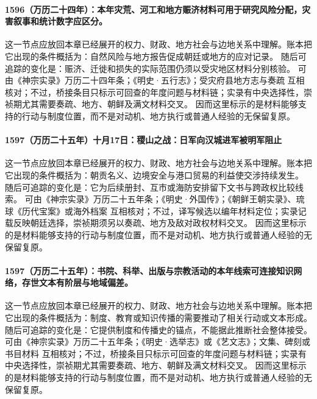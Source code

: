 \paragraph{1596（万历二十四年）：本年灾荒、河工和地方赈济材料可用于研究风险分配，灾害叙事和统计数字应区分。} 这一节点应放回本章已经展开的权力、财政、地方社会与边地关系中理解。账本把它出现的条件概括为：自然风险与地方报告促成朝廷或地方的应对记录。 随后可追踪的变化是：赈济、迁徙和损失的实际范围仍须以受灾地区材料分别核验。 可由《神宗实录》万历二十四年条；《明史·五行志》；受灾府县地方志与奏疏 互相核对；不过，桥接条目只标示可回查的年度问题与材料链；实录有中央选择性，崇祯期尤其需要奏疏、地方、朝鲜及满文材料交叉。 因而这里标示的是材料能够支持的行动与制度位置，而不是对动机、地方执行或普通人经验的无保留复原。

\paragraph{1597（万历二十五年）十月17日：稷山之战：日军向汉城进军被明军阻止} 这一节点应放回本章已经展开的权力、财政、地方社会与边地关系中理解。账本把它出现的条件概括为：朝贡名义、边境安全与港口贸易的利益使交涉持续发生。 随后可追踪的变化是：它为后续册封、互市或海防安排留下文书与跨政权比较线索。 可由《神宗实录》万历二十五年条；《明史·外国传》；《朝鲜王朝实录》、琉球《历代宝案》或海外档案 互相核对；不过，译写候选以编年材料定位；实录记载反映朝廷选择，崇祯期须另以奏疏、地方及敌对政权材料交叉。 因而这里标示的是材料能够支持的行动与制度位置，而不是对动机、地方执行或普通人经验的无保留复原。

\paragraph{1597（万历二十五年）：书院、科举、出版与宗教活动的本年线索可连接知识网络，存世文本有阶层与地域偏差。} 这一节点应放回本章已经展开的权力、财政、地方社会与边地关系中理解。账本把它出现的条件概括为：制度、教育或知识传播的需要推动了相关行动或文本形成。 随后可追踪的变化是：它提供制度和传播史的锚点，不能据此推断社会整体接受。 可由《神宗实录》万历二十五年条；《明史·选举志》或《艺文志》；文集、碑刻或书目材料 互相核对；不过，桥接条目只标示可回查的年度问题与材料链；实录有中央选择性，崇祯期尤其需要奏疏、地方、朝鲜及满文材料交叉。 因而这里标示的是材料能够支持的行动与制度位置，而不是对动机、地方执行或普通人经验的无保留复原。

